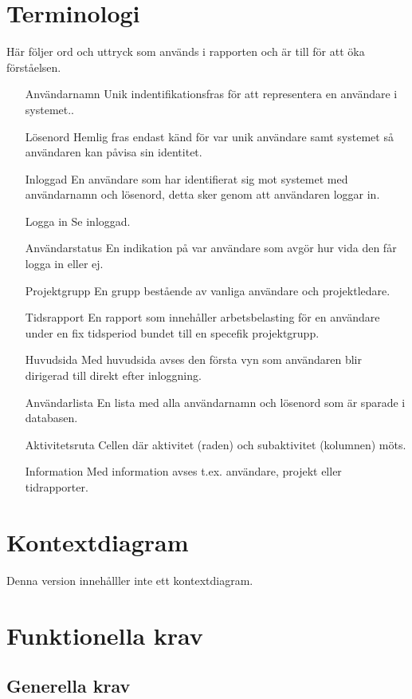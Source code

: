 \documentclass[a4paper]{article}
\begin{document}
\section{Terminologi}
Här följer ord och uttryck som används i rapporten och är till för att öka förståelsen.
\begin{itemize}
\item [Användarnamn] Unik indentifikationsfras för att representera en användare i systemet..
\item [Lösenord] Hemlig fras endast känd för var unik användare samt systemet så användaren kan påvisa sin identitet.
\item [Inloggad] En användare som har identifierat sig mot systemet med användarnamn och lösenord, detta sker genom att användaren loggar in.
\item [Logga in] Se inloggad.
\item [Användarstatus] En indikation på var användare som avgör hur vida den får logga in eller ej.
\item [Projektgrupp] En grupp bestående av vanliga användare och projektledare.
\item [Tidsrapport] En rapport som innehåller arbetsbelasting för en användare under en fix tidsperiod bundet till en specefik projektgrupp.
\item [Huvudsida] Med huvudsida avses den första vyn som användaren blir dirigerad till direkt efter inloggning. 
\item [Användarlista] En lista med alla användarnamn och lösenord som är sparade i databasen.
\item [Aktivitetsruta] Cellen där aktivitet (raden) och subaktivitet (kolumnen) möts.
\item [Information] Med information avses t.ex. användare, projekt eller tidrapporter.
\end{itemize}
\section{Kontextdiagram}
Denna version innehålller inte ett kontextdiagram.
\section{Funktionella krav}
\subsection{Generella krav}
\label{krav-funk-gen}
\end{document}
